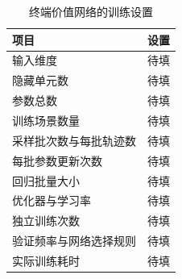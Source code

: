 \begin{table}[!htbp]
  \centering
  \caption{终端价值网络的训练设置}
  \label{exp:training}
  \small
  \begin{tabularx}{\linewidth}{@{}Xc@{}}
    \toprule
    项目 & 设置 \\
    \midrule
    输入维度 & 待填 \\
    隐藏单元数 & 待填 \\
    参数总数 & 待填 \\
    训练场景数量 & 待填 \\
    采样批次数与每批轨迹数 & 待填 \\
    每批参数更新次数 & 待填 \\
    回归批量大小 & 待填 \\
    优化器与学习率 & 待填 \\
    独立训练次数 & 待填 \\
    验证频率与网络选择规则 & 待填 \\
    实际训练耗时 & 待填 \\
    \bottomrule
  \end{tabularx}
\end{table}

